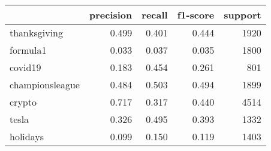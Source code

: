 \begin{tabular}{lrrrr}
\toprule
{} &  precision &  recall &  f1-score &  support \\
\midrule
thanksgiving    &      0.499 &   0.401 &     0.444 &     1920 \\
formula1        &      0.033 &   0.037 &     0.035 &     1800 \\
covid19         &      0.183 &   0.454 &     0.261 &      801 \\
championsleague &      0.484 &   0.503 &     0.494 &     1899 \\
crypto          &      0.717 &   0.317 &     0.440 &     4514 \\
tesla           &      0.326 &   0.495 &     0.393 &     1332 \\
holidays        &      0.099 &   0.150 &     0.119 &     1403 \\
\bottomrule
\end{tabular}
